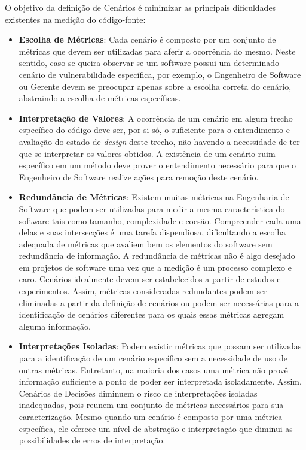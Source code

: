 O objetivo da definição de Cenários é minimizar as principais dificuldades existentes na medição do código-fonte:

%

\begin{itemize}
\item \textbf{Escolha de Métricas}: Cada cenário é composto por um conjunto de métricas que devem ser utilizadas para aferir a ocorrência do mesmo. Neste sentido, caso se queira observar se um software possui um determinado cenário de vulnerabilidade específica, por exemplo, o Engenheiro de Software ou Gerente devem se preocupar apenas sobre a escolha correta do cenário, abstraindo a escolha de métricas específicas.
\item \textbf{Interpretação de Valores}: A ocorrência de um cenário em algum trecho específico do código deve ser, por si só, o suficiente para o entendimento e avaliação do estado de \emph{design} deste trecho, não havendo a necessidade de ter que se interpretar os valores obtidos. A existência de um cenário ruim específico em um  método deve prover o entendimento necessário para que o Engenheiro de Software realize ações para remoção deste cenário.
\item \textbf{Redundância de Métricas}: Existem muitas métricas na Engenharia de Software que podem ser utilizadas para medir a mesma característica do software tais como tamanho, complexidade e coesão. Compreender cada uma delas e suas intersecções é uma tarefa dispendiosa, dificultando a escolha adequada de métricas que avaliem bem os elementos do software sem redundância de informação. A redundância de métricas não é algo desejado em projetos de software uma vez que a medição é um processo complexo e caro. Cenários idealmente devem ser estabelecidos a partir de estudos e experimentos. Assim, métricas consideradas redundantes podem ser eliminadas a partir da definição de cenários ou podem ser necessárias para a identificação de cenários diferentes para os quais essas métricas agregam alguma informação.
\item \textbf{Interpretações Isoladas}: Podem existir métricas que possam ser utilizadas para a identificação de um cenário específico sem a necessidade de uso de outras métricas. Entretanto, na maioria dos casos uma métrica não provê informação suficiente a ponto de poder ser interpretada isoladamente. Assim, Cenários de Decisões diminuem o risco de interpretações isoladas inadequadas, pois reunem um conjunto de métricas necessários para sua caracterização. Mesmo quando um cenário é composto por uma métrica específica, ele oferece um nível de abstração e interpretação que diminui as possibilidades de erros de interpretação.

\end{itemize}

